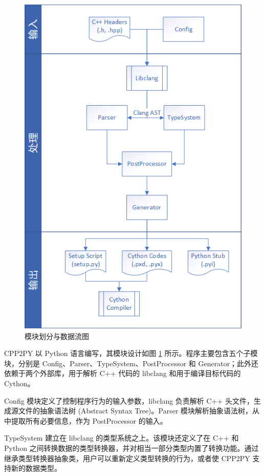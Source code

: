 \begin{figure}
  \centering
  \includegraphics[width=\linewidth]{figures/程序结构.png}
  \caption{模块划分与数据流图}
  \label{fig:2}
\end{figure}

CPP2PY 以 Python 语言编写，其模块设计如图 \ref{fig:2} 所示。程序主要包含五个子模块，分别是 Config、Parser、TypeSystem、PostProcessor 和 Generator；此外还依赖于两个外部库，用于解析 C++ 代码的 libclang 和用于编译目标代码的 Cython。

Config 模块定义了控制程序行为的输入参数，libclang 负责解析 C++ 头文件，生成源文件的抽象语法树 (Abstract Syntax Tree)。Parser 模块解析抽象语法树，从中提取所有必要信息，作为 PostProcessor 的输入。

TypeSystem 建立在 libclang 的类型系统之上。该模块还定义了在 C++ 和 Python 之间转换数据的类型转换器，并对相当一部分类型内置了转换功能。通过继承类型转换器抽象类，用户可以重新定义类型转换的行为，或者使 CPP2PY 支持新的数据类型。


